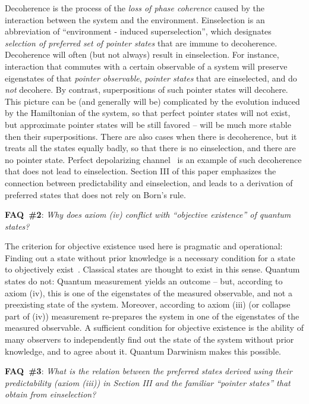 \documentclass[aps,amsmath,amssymb,amsfonts,floatfix]{revtex4-1}
\newcommand{\+}         {\dagger}
\begin{document}
{{{Decoherence is the process of the {\it loss of phase coherence} caused by the interaction between the system and the environment. Einselection is an abbreviation of ``environment - induced superselection'', which designates {\it selection of preferred set of pointer states} that are immune to decoherence. Decoherence will often (but not always) result in einselection. For instance, interaction that commutes with a certain observable of a system will preserve eigenstates of that {\it pointer observable}, {\it pointer states} that are einselected, and do {\it not} decohere. By contrast, superpositions of such pointer states will decohere. This picture can be (and generally will be) complicated by the evolution induced by the Hamiltonian of the system, so that perfect pointer states will not exist, but approximate pointer states will be still favored -- will be much more stable then their superpositions. There are also cases when there is decoherence, but it treats all the states equally badly, so that there is no einselection, and there are no pointer state. Perfect depolarizing channel~\cite{NC} is an example of such decoherence that does not lead to einselection. Section III of this paper emphasizes the connection between predictability and einselection, and leads to a derivation of preferred states that does not rely on Born's rule.

{\bf FAQ~\#2}: {\it Why does axiom (iv) conflict with ``objective existence'' of quantum states?} 

The criterion for objective existence used here is pragmatic and operational: Finding out a state without prior knowledge is a necessary condition for a state to objectively exist~\cite{75,42,43,8,9,10}. Classical states are thought to exist in this sense. Quantum states do not: Quantum measurement yields an outcome -- but, according to axiom (iv), this is one of the eigenstates of the measured observable, and not a preexisting state of the system. Moreover, according to axiom (iii) (or collapse part of (iv)) measurement re-prepares the system in one of the eigenstates of the measured observable. A sufficient condition for objective existence is the ability of many observers to independently find out the state of the system without prior knowledge, and to agree about it. Quantum Darwinism makes this possible.

{\bf FAQ~\#3}: {\it What is the relation between the preferred states derived using their predictability (axiom (iii)) in Section III and the familiar ``pointer states'' that obtain from einselection?}

}}}
\end{document}
